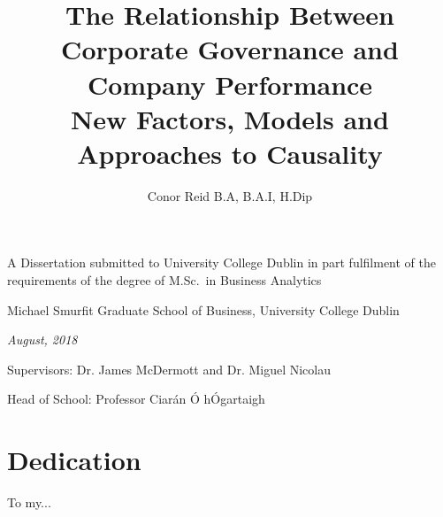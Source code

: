 \documentclass[a4paper,12pt,bibtotoc,notitlepage,oneside]{book}
\numberwithin{equation}{section}  %
\numberwithin{figure}{chapter}    %
\begin{document}
\frontmatter %

\title%
    {{\bf The Relationship Between Corporate Governance and Company Performance\\}
   \Large{ New Factors, Models and Approaches to Causality}}

\author{Conor Reid B.A, B.A.I, H.Dip}  %
\date{}
\maketitle %

{\normalsize
\vfill
\begin{center}
\textup{A Dissertation submitted to University College Dublin in part fulfilment
of the requirements of the degree of M.Sc.~in Business Analytics}
\end{center}
\vfill
\begin{center}
Michael Smurfit Graduate School of Business,
University College Dublin
\end{center}
\vfill
\begin{center}
\textit{August, 2018}
\end{center}
\vfill
\begin{center}
\textup{Supervisors: Dr. James McDermott and Dr. Miguel Nicolau}
\end{center}
\vfill
\begin{center}
\textup{Head of School: Professor Ciar\'an \'O h\'Ogartaigh}
\end{center}
\vfill
}

\thispagestyle{empty} %

\clearpage %




\chapter*{Dedication}
{To my...}
\end{document}
